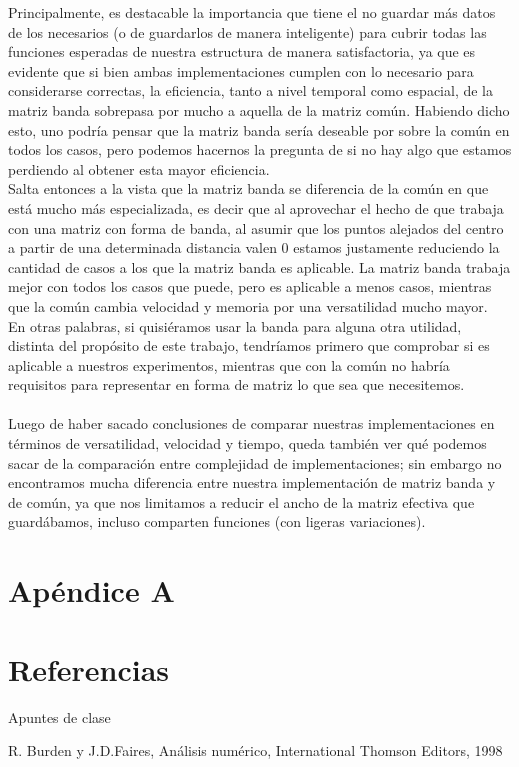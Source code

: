 \documentclass[a4paper]{article}
\begin{document}
Principalmente, es destacable la importancia que tiene el no guardar más datos de los necesarios (o de guardarlos de manera inteligente) para cubrir todas las funciones esperadas de nuestra estructura de manera satisfactoria, ya que es evidente que si bien ambas implementaciones cumplen con lo necesario para considerarse correctas, la eficiencia, tanto a nivel temporal como espacial, de la matriz banda sobrepasa por mucho a aquella de la matriz común.
Habiendo dicho esto, uno podría pensar que la matriz banda sería deseable por sobre la común en todos los casos, pero podemos hacernos la pregunta de si no hay algo que estamos perdiendo al obtener esta mayor eficiencia.\\
Salta entonces a la vista que la matriz banda se diferencia de la común en que está mucho más especializada, es decir que al aprovechar el hecho de que trabaja con una matriz con forma de banda, al asumir que los puntos alejados del centro a partir de una determinada distancia valen 0 estamos justamente reduciendo la cantidad de casos a los que la matriz banda es aplicable. La matriz banda trabaja mejor con todos los casos que puede, pero es aplicable a menos casos, mientras que la común cambia velocidad y memoria por una versatilidad mucho mayor.\\
En otras palabras, si quisiéramos usar la banda para alguna otra utilidad, distinta del propósito de este trabajo, tendríamos primero que comprobar si es aplicable a nuestros experimentos, mientras que con la común no habría requisitos para representar en forma de matriz lo que sea que necesitemos.\\ \\
Luego de haber sacado conclusiones de comparar nuestras implementaciones en términos de versatilidad, velocidad y tiempo, queda también ver qué podemos sacar de la comparación entre complejidad de implementaciones; sin embargo no encontramos mucha diferencia entre nuestra implementación de matriz banda y de común, ya que nos limitamos a reducir el ancho de la matriz efectiva que guardábamos, incluso comparten funciones (con ligeras variaciones).

\newpage
\section{Apéndice A}
\label{sec:ApA}



\newpage

\section{Referencias}
\label{sec:ref}

Apuntes de clase

R. Burden y J.D.Faires, Análisis numérico, International Thomson Editors, 1998
\end{document}
